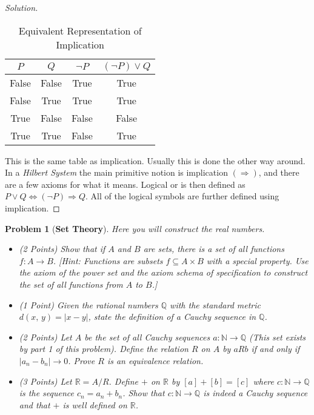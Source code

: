 \documentclass{article}
\theoremstyle{normal}
\newtheorem{problem}{Problem}
\begin{document}
\begin{proof}[Solution]
\begin{table}[H]
\begin{tabular}{ c | c | c | c }
                $P$&$Q$&$\neg{P}$&$(\neg{P})\lor{Q}$\\
                \hline
                False&False&True&True\\
                False&True&True&True\\
                True&False&False&False\\
                True&True&False&True
            \end{tabular}
            \caption{Equivalent Representation of Implication}
            \label{tab:imp_equiv}
        \end{table}
        This is the same table as implication. Usually this is done the other
        way around. In a \textit{Hilbert System} the main primitive notion is
        implication $(\Rightarrow)$, and there are a few axioms for what it
        means. Logical or is then defined as
        $P\lor{Q}\Leftrightarrow(\neg{P})\Rightarrow{Q}$. All of the logical
        symbols are further defined using implication.
    \end{proof}
    \clearpage
    \color{blue}
    \begin{problem}[\textbf{Set Theory}]
        \par\hfill\par\vspace{1em}
        Here you will construct the real numbers.
        \begin{itemize}
            \item (2 Points) Show that if $A$ and $B$ are sets, there is a set
                of all functions $f:A\rightarrow{B}$. [Hint: Functions are
                subsets $f\subseteq{A}\times{B}$ with a special property.
                Use the axiom of the power set and the axiom schema of
                specification to construct the set of all functions
                from $A$ to $B$.]
            \item (1 Point) Given the rational numbers $\mathbb{Q}$ with the
                standard metric $d(x,\,y)=|x-y|$, state the definition of a
                Cauchy sequence in $\mathbb{Q}$.
            \item (2 Points) Let $A$ be the set of all Cauchy sequences
                $a:\mathbb{N}\rightarrow\mathbb{Q}$ (This set exists by part 1
                of this problem). Define the relation $R$
                on $A$ by $aRb$ if and only if $|a_{n}-b_{n}|\rightarrow{0}$.
                Prove $R$ is an equivalence relation.
            \item (3 Points) Let $\mathbb{R}=A/R$. Define $+$ on $\mathbb{R}$
                by $[a]+[b]=[c]$ where $c:\mathbb{N}\rightarrow\mathbb{Q}$ is
                the sequence $c_{n}=a_{n}+b_{n}$. Show that
                $c:\mathbb{N}\rightarrow\mathbb{Q}$ is indeed a Cauchy sequence
                and that $+$ is well defined on $\mathbb{R}$.
        \end{itemize}
    \end{problem}
\end{document}
